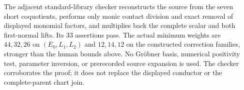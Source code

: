 The adjacent standard-library checker reconstructs the source from
the seven short coquotients, performs only monic contact division and
exact removal of displayed monomial factors, and multiplies back the
complete scalar and both first-normal lifts. Its 33 assertions pass.
The actual minimum weights are $44,32,26$ on $(E_0,L_1,L_2)$ and
$12,14,12$ on the constructed correction families, stronger than the
human bounds above. No Gr\"obner basis, numerical positivity test,
parameter inversion, or prerecorded source expansion is used.
The checker corroborates the proof; it does not replace the displayed
conductor or the complete-parent chart join.
